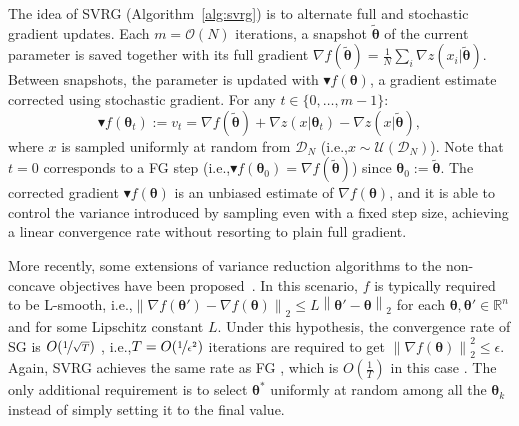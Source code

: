 \documentclass{article}
\makeatletter
\theoremstyle{remark}
\theoremstyle{definition}
\DeclareRobustCommand{\eg}{e.g.,\@\xspace}
\DeclareRobustCommand{\ie}{i.e.,\@\xspace}
\newcommand{\realspace}{\mathbb R}      %
\newcommand{\norm}[2][\infty]{\left\|#2\right\|_{#1}}
\newcommand{\vtheta}{\boldsymbol{\theta}}
\newcommand{\wt}[1]{\widetilde{#1}}
\makeatother
\begin{document}
The idea of SVRG (Algorithm~\ref{alg:svrg}) is to alternate full and stochastic gradient updates. 
Each $m = \mathcal{O}(N)$ iterations, a snapshot $\widetilde{\vtheta}$ of the current parameter is saved together with its full gradient $\nabla f(\widetilde{\vtheta}) = \frac{1}{N} \sum_i \nabla z(x_i|\widetilde{\vtheta})$.
Between snapshots, the parameter is updated with $\blacktriangledown f(\vtheta)$, a gradient estimate corrected using stochastic gradient. For any $t \in \{0,\ldots,m-1\}$:
\begin{equation}\label{E:svrg.gradient.correction}
        \blacktriangledown f(\vtheta_{t}) := v_t = \nabla f(\wt{\vtheta}) + \nabla z(x | \vtheta_t) - \nabla z(x | \wt{\vtheta}),
\end{equation} 
where $x$ is sampled uniformly at random from $\mathcal{D}_N$ (\ie $x \sim \mathcal{U}(\mathcal{D}_N)$).
Note that $t=0$ corresponds to a FG step (\ie $\blacktriangledown f(\vtheta_0) = \nabla f(\wt{\vtheta})$) since $\vtheta_0 := \wt{\vtheta}$.
The corrected gradient $\blacktriangledown f(\vtheta)$ is an unbiased estimate of $\nabla f(\vtheta)$, and it is able to control the variance introduced by sampling even with a fixed step size, achieving a linear convergence rate without resorting to plain full gradient.

More recently, some extensions of variance reduction algorithms to the non-concave objectives have been proposed~\citep[\eg][]{reddi2016stochastic,allen2016variance,reddi2016stochastic,reddi2016fast}. In this scenario, $f$ is typically required to be L-smooth, \ie $\norm[2]{\nabla f(\vtheta') - \nabla f(\vtheta)} \leq L\norm[2]{\vtheta'-\vtheta}$ for each $\vtheta,\vtheta'\in\realspace^n$ and for some Lipschitz constant $L$. Under this hypothesis, the convergence rate of SG is $O(\nicefrac{1}{\sqrt{T}})$ \cite{ghadimi2013stochastic}, \ie $T=O(\nicefrac{1}{\epsilon^2})$ iterations are required to get $\norm[2]{\nabla f(\vtheta)}^2\leq\epsilon$. Again, SVRG achieves the same rate as FG \cite{reddi2016stochastic}, which is $O(\frac{1}{T})$ in this case \cite{nesterov2013introductory}. The only additional requirement is to select $\vtheta^*$ uniformly at random among all the $\vtheta_k$ instead of simply setting it to the final value.
\end{document}
